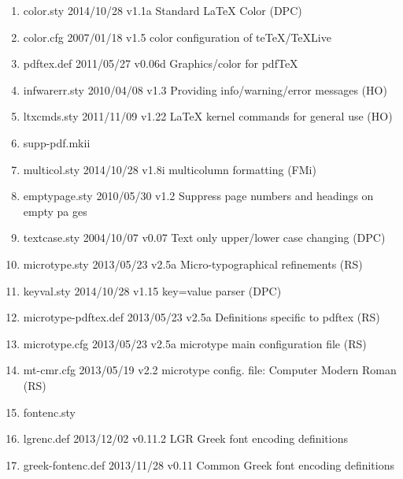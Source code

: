 \begin{enumerate}
\item color.sty 2014/10/28 v1.1a Standard LaTeX Color (DPC)
\item color.cfg 2007/01/18 v1.5 color configuration of teTeX/TeXLive
\item pdftex.def 2011/05/27 v0.06d Graphics/color for pdfTeX
\item infwarerr.sty 2010/04/08 v1.3 Providing info/warning/error messages (HO)
\item ltxcmds.sty 2011/11/09 v1.22 LaTeX kernel commands for general use (HO)
\item supp-pdf.mkii
\item multicol.sty 2014/10/28 v1.8i multicolumn formatting (FMi)
\item emptypage.sty 2010/05/30 v1.2 Suppress page numbers and headings on empty pa
ges
\item textcase.sty 2004/10/07 v0.07 Text only upper/lower case changing (DPC)
\item 	microtype.sty 2013/05/23 v2.5a Micro-typographical refinements (RS)
\item 	keyval.sty 2014/10/28 v1.15 key=value parser (DPC)
\item 	microtype-pdftex.def 2013/05/23 v2.5a Definitions specific to pdftex (RS)
\item 	microtype.cfg 2013/05/23 v2.5a microtype main configuration file (RS)
\item 	mt-cmr.cfg 2013/05/19 v2.2 microtype config. file: Computer Modern Roman (RS)
\item fontenc.sty
\item lgrenc.def 2013/12/02 v0.11.2 LGR Greek font encoding definitions
\item greek-fontenc.def 2013/11/28 v0.11 Common Greek font encoding definitions

\end{enumerate}
